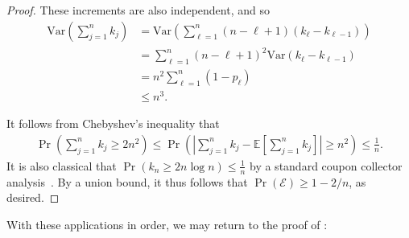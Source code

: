 \documentclass[11pt]{article}
\begin{document}
\begin{proof}
    These increments are also independent, and so
    \begin{align*}
        \mathrm{Var}\left(\sum_{j=1}^{n} k_j\right)&=\mathrm{Var}\left(\sum_{\ell=1}^n (n-\ell+1)(k_{\ell}-k_{\ell-1})\right)\\
        &=\sum_{\ell=1}^n (n-\ell+1)^2\mathrm{Var}(k_{\ell}-k_{\ell-1})\\
        &=n^2\sum_{\ell=1}^n (1-p_{\ell})\\
        &\leq n^3.
    \end{align*}

    It follows from Chebyshev's inequality that
    \begin{align*}
        \Pr\left(\sum_{j=1}^n k_j\geq 2n^2\right)\leq \Pr\left(\left\vert\sum_{j=1}^n k_j-\mathbb{E}\left[\sum_{j=1}^n k_j\right]\right\vert\geq n^2\right)\leq \frac{1}{n}.
    \end{align*}
    It is also classical that $\Pr(k_n\geq 2n\log n)\leq \frac{1}{n}$ by a standard coupon collector analysis~\cite{levin2017markov}. By a union bound, it thus follows that $\Pr(\mathcal{E})\geq 1-2/n$, as desired.    
\end{proof}

With these applications in order, we may return to the proof of :
\end{document}
